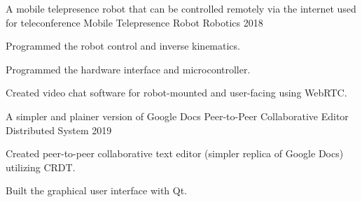 

\begin{cventries}
    \cventry
        {A mobile telepresence robot that can be controlled remotely via the internet used for teleconference} %
        {Mobile Telepresence Robot} %
        {Robotics} %
        {2018} %
        {
            \begin{cvitems} %
                \item {Programmed the robot control and inverse kinematics.}
                \item {Programmed the hardware interface and microcontroller.}
                \item {Created video chat software for robot-mounted and user-facing using WebRTC.}
            \end{cvitems}
        }
    
    \cventry
        {A simpler and plainer version of Google Docs} %
        {Peer-to-Peer Collaborative Editor} %
        {Distributed System} %
        {2019} %
        {
            \begin{cvitems} %
                \item {Created peer-to-peer collaborative text editor (simpler replica of Google Docs) utilizing CRDT.}
                \item {Built the graphical user interface with Qt.}
            \end{cvitems}
        }
\end{cventries}
